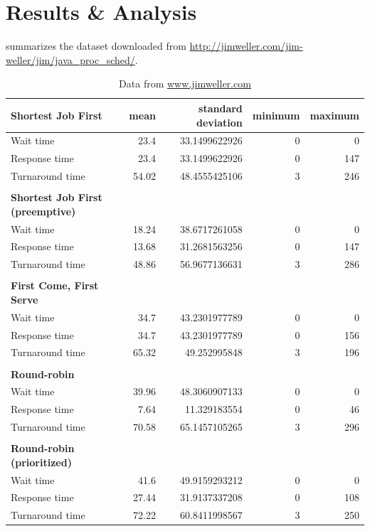 \documentclass[12pt,letterpaper]{article}
\begin{document}
  	\section{Results \& Analysis}

  		 summarizes the dataset downloaded from \url{http://jimweller.com/jim-weller/jim/java_proc_sched/}.

  		\begin{table}
  			\label{table:data-jim}
  			\caption{Data from \url{www.jimweller.com}}
	  		\begin{tabular}{l r r r r}
				\textbf{Shortest Job First} & mean & standard deviation & minimum & maximum\\
				\hline
Wait time &		23.4 &	33.1499622926 &	0 &	0 	\\
Response time &		23.4 &	33.1499622926 &	0 &	147 	\\
Turnaround time &	54.02 &	48.4555425106 &	3 &	246 	\\
				\\
				\textbf{Shortest Job First (preemptive)} \\
				\hline
Wait time &		18.24 &	38.6717261058 &	0 &	0 	\\
Response time &		13.68 &	31.2681563256 &	0 &	147 	\\
Turnaround time &	48.86 &	56.9677136631 &	3 &	286 	\\
				\\
				\textbf{First Come, First Serve} \\
				\hline
Wait time &		34.7 &	43.2301977789 &	0 &	0 	\\
Response time &		34.7 &	43.2301977789 &	0 &	156 	\\
Turnaround time &	65.32 &	49.252995848 &	3 &	196 	\\
				\\
				\textbf{Round-robin} \\
				\hline
Wait time &		39.96 &	48.3060907133 &	0 &	0 	\\
Response time &		7.64 &	11.329183554 &	0 &	46 	\\
Turnaround time &	70.58 &	65.1457105265 &	3 &	296 	\\
				\\
				\textbf{Round-robin (prioritized)} \\
				\hline
Wait time &		41.6 &	49.9159293212 &	0 &	0 	\\
Response time &		27.44 &	31.9137337208 &	0 &	108 	\\
Turnaround time &	72.22 &	60.8411998567 &	3 &	250 	\\

\end{tabular}
\end{table}
\end{document}
